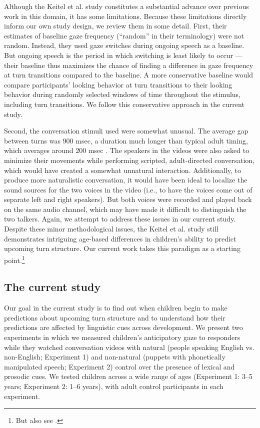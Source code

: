 \documentclass[authoryear, 12pt]{elsarticle}
\begin{document}
Although the Keitel et al. \citeyearpar{keitel2013} study constitutes a substantial advance over previous work in this domain, it has some limitations. Because these limitations directly inform our own study design, we review them in some detail. First, their estimates of baseline gaze frequency (``random'' in their terminology) were not random. Instead, they used gaze switches during ongoing speech as a baseline. But ongoing speech is the period in which switching is least likely to occur \citep{hirvenkari2013}---their baseline thus maximizes the chance of finding a difference in gaze frequency at turn transitions compared to the baseline. A more conservative baseline would compare participants' looking behavior at turn transitions to their looking behavior during randomly selected windows of time throughout the stimulus, including turn transitions. We follow this conservative approach in the current study. 

Second, the conversation stimuli \citet{keitel2013} used were somewhat unusual. The average gap between turns was 900 msec, a duration much longer than typical adult timing, which averages around 200 msec \citep{stivers2009}. The speakers in the videos were also asked to minimize their movements while performing scripted, adult-directed conversation, which would have created a somewhat unnatural interaction. Additionally, to produce more naturalistic conversation, it would have been ideal to localize the sound sources for the two voices in the video (i.e., to have the voices come out of separate left and right speakers). But both voices were recorded and played back on the same audio channel, which may have made it difficult to distinguish the two talkers. Again, we attempt to address these issues in our current study. Despite these minor methodological issues, the Keitel et al. \citeyearpar{keitel2013} study still demonstrates intriguing age-based differences in children's ability to predict upcoming turn structure. Our current work takes this paradigm as a starting point.\footnote{But also see \citet{casillas2012, casillas2013}.} 

\subsection{The current study}

Our goal in the current study is to find out when children begin to make predictions about upcoming turn structure and to understand how their predictions are affected by linguistic cues across development. We present two experiments in which we measured children's anticipatory gaze to responders while they watched conversation videos with natural (people speaking English vs. non-English; Experiment 1) and non-natural (puppets with phonetically manipulated speech; Experiment 2) control over the presence of lexical and prosodic cues. We tested children across a wide range of ages (Experiment 1: 3--5 years; Experiment 2: 1--6 years), with adult control participants in each experiment.
\end{document}
